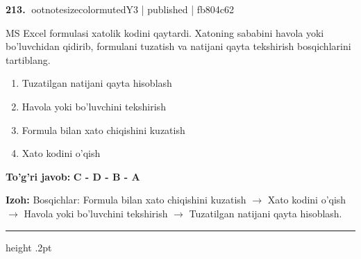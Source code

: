 \documentclass[10pt,a4paper]{article}
\begin{document}
\textbf{\color{ink}213.} {ootnotesizecolor{muted}Y3 | published | fb804c62}
\par
MS Excel formulasi xatolik kodini qaytardi. Xatoning sababini havola yoki bo'luvchidan qidirib, formulani tuzatish va natijani qayta tekshirish bosqichlarini tartiblang.
\begin{enumerate}[label=\Alph*),leftmargin=9mm]
\item Tuzatilgan natijani qayta hisoblash
\item Havola yoki bo'luvchini tekshirish
\item Formula bilan xato chiqishini kuzatish
\item Xato kodini o'qish
\end{enumerate}
\begin{tcolorbox}[enhanced,breakable,colback=teal!4,colframe=teal!55!black,boxrule=0.45pt,arc=1.2mm,left=2.8mm,right=2.8mm,top=2mm,bottom=2mm]
\textbf{\color{teal}To'g'ri javob:} \textbf{C - D - B - A}
\par\smallskip
\textbf{Izoh:} Bosqichlar: Formula bilan xato chiqishini kuzatish \ensuremath{\rightarrow} Xato kodini o'qish \ensuremath{\rightarrow} Havola yoki bo'luvchini tekshirish \ensuremath{\rightarrow} Tuzatilgan natijani qayta hisoblash.
\end{tcolorbox}
\vspace{2mm}\hrule height .2pt\vspace{2mm}
\end{document}
